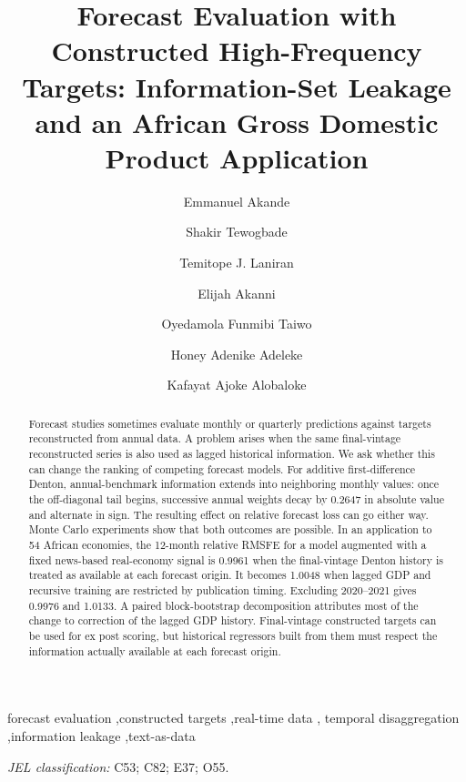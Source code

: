\documentclass[preprint,12pt,authoryear]{elsarticle}
\begin{document}
\begin{frontmatter}

\title{Forecast Evaluation with Constructed High-Frequency Targets:
Information-Set Leakage and an African Gross Domestic Product Application}
\author[caperc]{Emmanuel Akande}
\author[caperc]{Shakir Tewogbade}
\author[cbn]{Temitope J. Laniran}
\author[cbn]{Elijah Akanni}
\author[caperc]{Oyedamola Funmibi Taiwo}
\author[ui]{Honey Adenike Adeleke}
\author[ui]{Kafayat Ajoke Alobaloke}

\address[caperc]{CAPE Economic Research and Consulting, 11120 Godwit Ln, Charlotte, NC 28278, USA}
\address[cbn]{Central Bank of Nigeria, Plot 33, Abubakar Tafawa Balewa Way, Central Business District, Abuja, Federal Capital Territory, Nigeria}
\address[ui]{University of Ibadan, Ibadan, Oyo State, Nigeria}


\begin{abstract}
Forecast studies sometimes evaluate monthly or quarterly predictions against targets reconstructed from annual data. A problem arises when the same final-vintage reconstructed series is also used as lagged historical information. We ask whether this can change the ranking of competing forecast models. For additive first-difference Denton, annual-benchmark information extends into neighboring monthly values: once the off-diagonal tail begins, successive annual weights decay by 0.2647 in absolute value and alternate in sign. The resulting effect on relative forecast loss can go either way. Monte Carlo experiments show that both outcomes are possible. In an application to 54 African economies, the 12-month relative RMSFE for a model augmented with a fixed news-based real-economy signal is 0.9961 when the final-vintage Denton history is treated as available at each forecast origin. It becomes 1.0048 when lagged GDP and recursive training are restricted by publication timing. Excluding 2020--2021 gives 0.9976 and 1.0133. A paired block-bootstrap decomposition attributes most of the change to correction of the lagged GDP history. Final-vintage constructed targets can be used for ex post scoring, but historical regressors built from them must respect the information actually available at each forecast origin.
\end{abstract}

\begin{keyword}
forecast evaluation \sep constructed targets \sep real-time data \sep
temporal disaggregation \sep information leakage \sep text-as-data
\par\medskip\textit{JEL classification:} C53; C82; E37; O55.
\end{keyword}
\end{frontmatter}
\singlespacing
\end{document}
